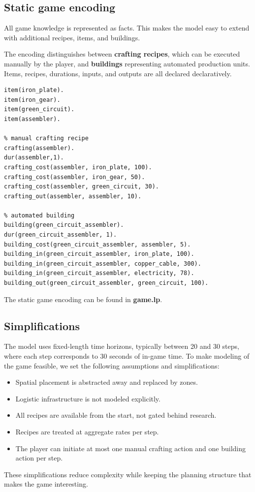 \documentclass{article}
\begin{document}

\subsection{Static game encoding}
All game knowledge is represented as facts. This makes the model easy to extend with additional recipes, items, and buildings.

The encoding distinguishes between \textbf{crafting recipes}, which can be executed manually by the player, and \textbf{buildings} representing automated production units. Items, recipes, durations, inputs, and outputs are all declared declaratively.

\begin{lstlisting}[label=lst:game_encoding,language=asp,caption={Excerpt of game encoding (game.lp).}]
% items
item(iron_plate).
item(iron_gear).
item(green_circuit).
item(assembler).

% manual crafting recipe
crafting(assembler).
dur(assembler,1).
crafting_cost(assembler, iron_plate, 100).
crafting_cost(assembler, iron_gear, 50).
crafting_cost(assembler, green_circuit, 30).
crafting_out(assembler, assembler, 10).

% automated building
building(green_circuit_assembler).
dur(green_circuit_assembler, 1).
building_cost(green_circuit_assembler, assembler, 5).
building_in(green_circuit_assembler, iron_plate, 100).
building_in(green_circuit_assembler, copper_cable, 300).
building_in(green_circuit_assembler, electricity, 78).
building_out(green_circuit_assembler, green_circuit, 100).
\end{lstlisting}

The static game encoding can be found in \textbf{game.lp}.

\subsection{Simplifications}
The model uses fixed-length time horizons, typically between 20 and 30 steps, where each step corresponds to 30 seconds of in-game time. To make modeling of the game feasible, we set the following assumptions and simplifications:
\begin{itemize}
    \item Spatial placement is abstracted away and replaced by zones.
    \item Logistic infrastructure is not modeled explicitly.
    \item All recipes are available from the start, not gated behind research.
    \item Recipes are treated at aggregate rates per step.
    \item The player can initiate at most one manual crafting action and one building action per step.
\end{itemize}
These simplifications reduce complexity while keeping the planning structure that makes the game interesting.
\end{document}
